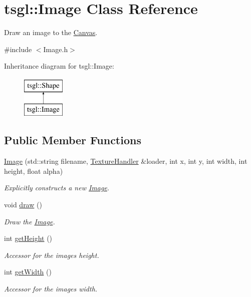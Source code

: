 \hypertarget{classtsgl_1_1_image}{}\section{tsgl\+:\+:Image Class Reference}
\label{classtsgl_1_1_image}


Draw an image to the \hyperlink{classtsgl_1_1_canvas}{Canvas}.  




{\ttfamily \#include $<$Image.\+h$>$}

Inheritance diagram for tsgl\+:\+:Image\+:\begin{figure}[H]
\begin{center}
\leavevmode
\includegraphics[height=2.000000cm]{classtsgl_1_1_image}
\end{center}
\end{figure}
\subsection*{Public Member Functions}
\begin{DoxyCompactItemize}
\item 
\hyperlink{classtsgl_1_1_image_a497894a4dbfa46d1e3aefd7dbe086cc3}{Image} (std\+::string filename, \hyperlink{classtsgl_1_1_texture_handler}{Texture\+Handler} \&loader, int x, int y, int width, int height, float alpha)
\begin{DoxyCompactList}\small\item\em Explicitly constructs a new \hyperlink{classtsgl_1_1_image}{Image}. \end{DoxyCompactList}\item 
void \hyperlink{classtsgl_1_1_image_a85732de312b98dd5ce5a9cc319bbf8c5}{draw} ()
\begin{DoxyCompactList}\small\item\em Draw the \hyperlink{classtsgl_1_1_image}{Image}. \end{DoxyCompactList}\item 
int \hyperlink{classtsgl_1_1_image_afa939262dcf32c9a504efe30a8de5c58}{get\+Height} ()
\begin{DoxyCompactList}\small\item\em Accessor for the image\textquotesingle{}s height. \end{DoxyCompactList}\item 
int \hyperlink{classtsgl_1_1_image_af01d5f815b91f20fd441f9bcec671d79}{get\+Width} ()
\begin{DoxyCompactList}\small\item\em Accessor for the image\textquotesingle{}s width. \end{DoxyCompactList}\end{DoxyCompactItemize}
